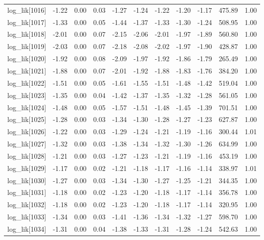 \begin{table}[ht]
\begin{tabular}{rrrrrrrrrrr}
  log\_lik[1016] & -1.22 & 0.00 & 0.03 & -1.27 & -1.24 & -1.22 & -1.20 & -1.17 & 475.89 & 1.00 \\ 
  log\_lik[1017] & -1.33 & 0.00 & 0.05 & -1.44 & -1.37 & -1.33 & -1.30 & -1.24 & 508.95 & 1.00 \\ 
  log\_lik[1018] & -2.01 & 0.00 & 0.07 & -2.15 & -2.06 & -2.01 & -1.97 & -1.89 & 560.80 & 1.00 \\ 
  log\_lik[1019] & -2.03 & 0.00 & 0.07 & -2.18 & -2.08 & -2.02 & -1.97 & -1.90 & 428.87 & 1.00 \\ 
  log\_lik[1020] & -1.92 & 0.00 & 0.08 & -2.09 & -1.97 & -1.92 & -1.86 & -1.79 & 265.49 & 1.00 \\ 
  log\_lik[1021] & -1.88 & 0.00 & 0.07 & -2.01 & -1.92 & -1.88 & -1.83 & -1.76 & 384.20 & 1.00 \\ 
  log\_lik[1022] & -1.51 & 0.00 & 0.05 & -1.61 & -1.55 & -1.51 & -1.48 & -1.42 & 519.04 & 1.00 \\ 
  log\_lik[1023] & -1.35 & 0.00 & 0.04 & -1.42 & -1.37 & -1.35 & -1.32 & -1.28 & 561.05 & 1.00 \\ 
  log\_lik[1024] & -1.48 & 0.00 & 0.05 & -1.57 & -1.51 & -1.48 & -1.45 & -1.39 & 701.51 & 1.00 \\ 
  log\_lik[1025] & -1.28 & 0.00 & 0.03 & -1.34 & -1.30 & -1.28 & -1.27 & -1.23 & 627.87 & 1.00 \\ 
  log\_lik[1026] & -1.22 & 0.00 & 0.03 & -1.29 & -1.24 & -1.21 & -1.19 & -1.16 & 300.44 & 1.01 \\ 
  log\_lik[1027] & -1.32 & 0.00 & 0.03 & -1.38 & -1.34 & -1.32 & -1.30 & -1.26 & 634.99 & 1.00 \\ 
  log\_lik[1028] & -1.21 & 0.00 & 0.03 & -1.27 & -1.23 & -1.21 & -1.19 & -1.16 & 453.19 & 1.00 \\ 
  log\_lik[1029] & -1.17 & 0.00 & 0.02 & -1.21 & -1.18 & -1.17 & -1.16 & -1.14 & 338.97 & 1.01 \\ 
  log\_lik[1030] & -1.27 & 0.00 & 0.03 & -1.34 & -1.30 & -1.27 & -1.25 & -1.21 & 344.35 & 1.00 \\ 
  log\_lik[1031] & -1.18 & 0.00 & 0.02 & -1.23 & -1.20 & -1.18 & -1.17 & -1.14 & 356.78 & 1.00 \\ 
  log\_lik[1032] & -1.18 & 0.00 & 0.02 & -1.23 & -1.20 & -1.18 & -1.17 & -1.14 & 320.95 & 1.00 \\ 
  log\_lik[1033] & -1.34 & 0.00 & 0.03 & -1.41 & -1.36 & -1.34 & -1.32 & -1.27 & 598.70 & 1.00 \\ 
  log\_lik[1034] & -1.31 & 0.00 & 0.04 & -1.38 & -1.33 & -1.31 & -1.28 & -1.24 & 542.63 & 1.00 \\ 

\end{tabular}
\end{table}
